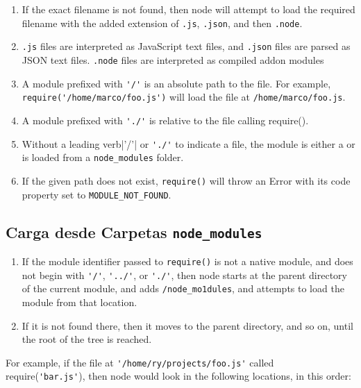 \begin{enumerate}
\item If the exact filename is not found, then node will attempt to
load the required filename with the added extension of \verb|.js|,
\verb|.json|, and then \verb|.node|.

\item
\verb|.js| files are interpreted as JavaScript text files, and \verb|.json| files are parsed as JSON text files. \verb|.node| files are interpreted as compiled addon modules 

\item
A module prefixed with \verb|'/'| is an absolute path to the file. For example,
\verb|require('/home/marco/foo.js')| will load the file at \verb|/home/marco/foo.js|.

\item
A module prefixed with \verb|'./'| is relative to the file calling require(). 

\item
Without a leading verb|'/'| or \verb|'./'| to indicate a file, the module is either a 
 or is loaded from a \verb|node_modules| folder.

\item
If the given path does not exist, \verb|require()| 
will throw an Error with its code property set to \verb'MODULE_NOT_FOUND'.
\end{enumerate}

\subsection{Carga desde Carpetas {\tt node\_modules}}

\begin{enumerate}
\item
If the module identifier passed to \verb|require()| is not a native module,
and does not begin with \verb|'/'|, \verb|'../'|, or \verb|'./'|, then node starts at the
parent directory of the current module, and adds \verb|/node_mo1dules|, and
attempts to load the module from that location.

\item
If it is not found there, then it moves to the parent directory, and so
on, until the root of the tree is reached.
\end{enumerate}

For example, if the file at \verb|'/home/ry/projects/foo.js'| called
require(\verb|'bar.js'|), then node would look in the following locations,
in this order:

